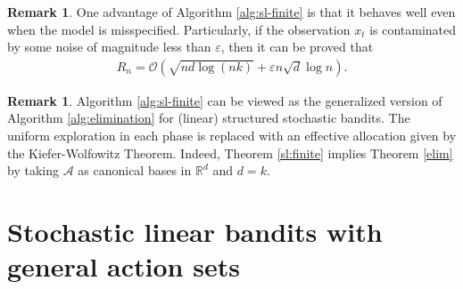 \documentclass[letterpaper,10pt,openright,openany]{book}
\numberwithin{equation}{section}
\theoremstyle{plain}
\theoremstyle{definition}
\newtheorem{Rem}[Th]{Remark}
\def\R{{\mathbb R}}
\def\R{{\mathbb R}}
\def\e{{\varepsilon}}
\begin{document}
\begin{Rem}
One advantage of Algorithm \ref{alg:sl-finite} is that it behaves well even when the model is misspecified. Particularly, if the observation $x_t$ is contaminated by some noise of magnitude less than $\e$, then it can be proved that 
\begin{align*}
R_n=\mathcal O\left(\sqrt{nd\log (nk)}+\e n\sqrt{d}\log n\right). 
\end{align*}
\end{Rem}

\begin{Rem}
Algorithm \ref{alg:sl-finite} can be viewed as the generalized version of Algorithm \ref{alg:elimination} for (linear) structured stochastic bandits. The uniform exploration in each phase is replaced with an effective allocation given by the Kiefer-Wolfowitz Theorem. Indeed, Theorem \ref{sl:finite} implies Theorem \ref{elim} by taking $\mathcal A$ as canonical bases in $\R^d$ and $d=k$.  
\end{Rem}

\section{Stochastic linear bandits with general action sets}
\end{document}
